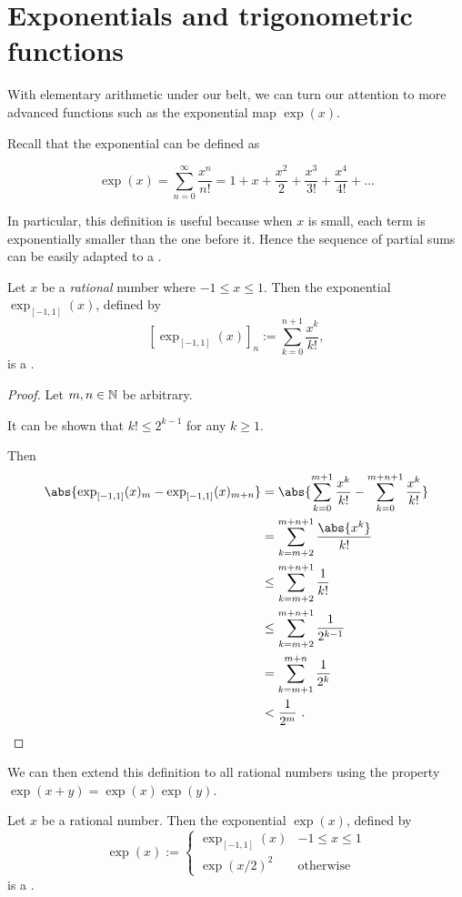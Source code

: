 \documentclass[leqno]{report}
\begin{document}
\section{Exponentials and trigonometric functions}

With elementary arithmetic under our belt, we can turn our attention to more advanced functions such as the exponential map $\exp(x)$.

Recall that the exponential can be defined as

\[
    \exp(x) = \sum_{n=0}^\infty \frac{x^n}{n!}
    = 1 + x + \frac{x^2}{2} + \frac{x^3}{3!} + \frac{x^4}{4!} + \ldots
\]

In particular, this definition is useful because when $x$ is small, each term is exponentially smaller than the one before it. Hence the sequence of partial sums can be easily adapted to a \FCCS.

\begin{Proposition}
    Let $x$ be a \emph{rational} number where $-1 \leq x \leq 1$. Then the exponential $\exp_{[-1,1]}(x)$, defined by
    \[
        \left[\exp_{[-1,1]}(x)\right]_n := \sum_{k=0}^{n+1} \frac{x^k}{k!},
    \]
    is a \FCCS.
\end{Proposition}

\begin{proof}
    Let $m, n \in \mathbb{N}$ be arbitrary.

    It can be shown that $k! \leq 2^{k-1}$ for any $k \geq 1$.

    Then
    \begin{align*}
        \abs{\exp_{[-1,1]}(x)_m - \exp_{[-1,1]}(x)_{m+n}}
        &= \abs{\sum_{k=0}^{m+1} \frac{x^k}{k!} - \sum_{k=0}^{m+n+1} \frac{x^k}{k!}} \\
        &= \sum_{k=m+2}^{m+n+1} \frac{\abs{x^k}}{k!} \\
        &\leq \sum_{k=m+2}^{m+n+1} \frac{1}{k!} \\
        &\leq \sum_{k=m+2}^{m+n+1} \frac{1}{2^{k-1}} \\
        &= \sum_{k=m+1}^{m+n} \frac{1}{2^k} \\
        &< \frac{1}{2^m} \ . \qedhere
    \end{align*}
\end{proof}

We can then extend this definition to all rational numbers using the property $\exp(x + y) = \exp(x)\exp(y)$.

\begin{Corollary}[Exponential on $\Q$]
    Let $x$ be a rational number. Then the exponential $\exp(x)$, defined by
    \[
        \exp(x) := \begin{cases}
            \exp_{[-1,1]}(x) & -1 \leq x \leq 1 \\
            \exp(x/2)^2 & \textrm{otherwise}
        \end{cases}
    \]
    is a \FCCS.
\end{Corollary}
\end{document}
